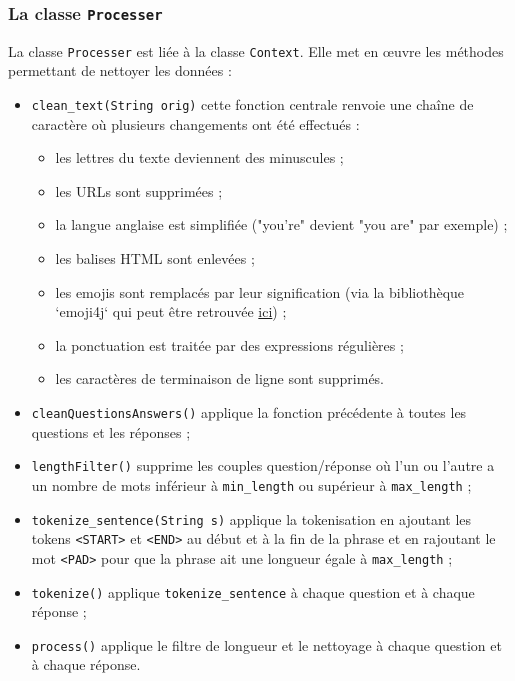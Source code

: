 \documentclass[10pt,a4paper]{article}
\begin{document}
\subsubsection{La classe \texttt{Processer}}
La classe \texttt{Processer} est liée à la classe \texttt{Context}. Elle met en œuvre les méthodes permettant de nettoyer les données :
\begin{itemize}
	\item \texttt{clean\_text(String orig)} cette fonction centrale renvoie une chaîne de caractère où plusieurs changements ont été effectués :
	      \begin{itemize}
		      \item les lettres du texte deviennent des minuscules ;
		      \item les URLs sont supprimées ;
		      \item la langue anglaise est simplifiée ("you're" devient "you are" par exemple) ;
		      \item les balises HTML sont enlevées ;
		      \item les emojis sont remplacés par leur signification (via la bibliothèque `emoji4j` qui peut être retrouvée \href{https://github.com/kcthota/emoji4j}{ici}) ;
		      \item la ponctuation est traitée par des expressions régulières ;
		      \item les caractères de terminaison de ligne sont supprimés.
	      \end{itemize}
	\item \texttt{cleanQuestionsAnswers()} applique la fonction précédente à toutes les questions et les réponses ;
	\item \texttt{lengthFilter()} supprime les couples question/réponse où l'un ou l'autre a un nombre de mots inférieur à \texttt{min\_length} ou supérieur à \texttt{max\_length} ;
	\item \texttt{tokenize\_sentence(String s)} applique la tokenisation en ajoutant les tokens \texttt{<START>} et \texttt{<END>} au début et à la fin de la phrase et en rajoutant le mot \texttt{<PAD>} pour que la phrase ait une longueur égale à \texttt{max\_length} ;
	\item \texttt{tokenize()} applique \texttt{tokenize\_sentence} à chaque question et à chaque réponse ;
	\item \texttt{process()} applique le filtre de longueur et le nettoyage à chaque question et à chaque réponse.
\end{itemize}
\end{document}
